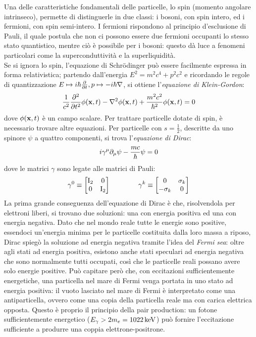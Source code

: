 Una delle caratteristiche fondamentali delle particelle, lo spin (momento angolare intrinseco), permette di distinguerle in due classi: i bosoni, con spin intero, ed i fermioni, con spin semi-intero. I fermioni rispondono al principio d'esclusione di Pauli, il quale postula che non ci possono essere due fermioni occupanti lo stesso stato quantistico, mentre ciò è possibile per i bosoni: questo dà luce a fenomeni particolari come la superconduttività e la superliquidità.\\
Se si ignora lo spin, l'equazione di Schrödinger può essere facilmente espressa in forma relativistica; partendo dall'energia $ E^2 = m^2 c^4 + p^2 c^2 $ e ricordando le regole di quantizzazione $ E \mapsto i\hbar \frac{\partial}{\partial t}, p \mapsto -i\hbar \nabla $, si ottiene l'\textit{equazione di Klein-Gordon}:
\begin{equation}
	\frac{1}{c^2} \frac{\partial^2}{\partial t^2} \phi(\mathbf{x},t) - \nabla^2 \phi(\mathbf{x},t) + \frac{m^2 c^2}{\hbar^2} \phi(\mathbf{x},t) = 0
	\label{eq:7.1}
\end{equation}
dove $ \phi(\mathbf{x},t) $ è un campo scalare. Per trattare particelle dotate di spin, è necessario trovare altre equazioni. Per particelle con $ s = \frac{1}{2} $, descritte da uno spinore $ \psi $ a quattro componenti, si trova l'\textit{equazione di Dirac}:
\begin{equation}
	i \gamma^{\mu} \partial_{\mu} \psi - \frac{mc}{\hbar} \psi = 0
	\label{eq:7.2}
\end{equation}
dove le matrici $ \gamma $ sono legate alle matrici di Pauli:
\begin{equation*}
	\gamma^0 \equiv
	\begin{bmatrix}
		\mathrm{I}_2 & 0 \\ 0 & \mathrm{I}_2
	\end{bmatrix}
	\qquad \qquad
	\gamma^k \equiv
	\begin{bmatrix}
		0 & \sigma_k \\ -\sigma_k & 0
	\end{bmatrix}
\end{equation*}
La prima grande conseguenza dell'equazione di Dirac è che, risolvendola per elettroni liberi, si trovano due soluzioni: una con energia positiva ed una con energia negativa. Dato che nel mondo reale tutte le energie sono positive, essendoci un'energia minima per le particelle costituita dalla loro massa a riposo, Dirac spiegò la soluzione ad energia negativa tramite l'idea del \textit{Fermi sea}: oltre agli stati ad energia positiva, esistono anche stati speculari ad energia negativa che sono normalmente tutti occupati, così che le particelle reali possano avere solo energie positive. Può capitare però che, con eccitazioni sufficientemente energetiche, una particella nel mare di Fermi venga portata in uno stato ad energia positiva: il vuoto lasciato nel mare di Fermi è interpretato come una antiparticella, ovvero come una copia della particella reale ma con carica elettrica opposta. Questo è proprio il principio della pair production: un fotone sufficientemente energetico ($ E_{\gamma} > 2m_e = 1022\,\mathrm{keV} $) può fornire l'eccitazione sufficiente a produrre una coppia elettrone-positrone.\\
